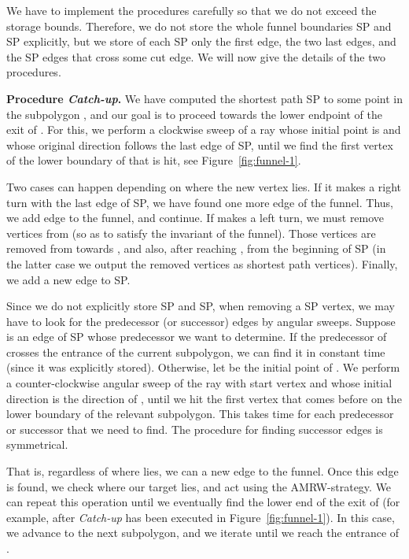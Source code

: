 \documentclass[11pt,a4paper]{article}
\begin{document}
We have to implement the procedures carefully so that we do not exceed the
storage bounds.  Therefore, we do not store the whole funnel boundaries
SP and SP explicitly, but we store of each SP only the first edge,
the two last edges, and the  SP edges that cross some cut edge.
We will now give the details of the two procedures.

\noindent
\textbf{Procedure \emph{Catch-up}.}
We have computed the shortest path SP to some point
 in the subpolygon
, and our goal is to proceed towards
the lower endpoint of the exit of .
For this, we perform a clockwise sweep of a ray whose initial point is 
and whose original direction follows the last edge of SP, until we
find the first vertex of the lower boundary of  that is hit,
see Figure~\ref{fig:funnel-1}.

Two cases can happen depending on where the new vertex  lies. If it
makes a right turn with the last edge of SP, we have found
one more edge of the funnel. Thus, we add edge  to the funnel, and
continue. If  makes a left turn, we must remove vertices from 
(so as to satisfy the invariant of the funnel). Those vertices are
removed from  towards ,
and also, after reaching , from the beginning of SP (in the
latter case we output the removed vertices as shortest path vertices).
Finally, we add a new edge to SP.

Since we do not explicitly store SP and SP, when removing a SP vertex,
we may have to look for the
predecessor (or successor) edges by angular sweeps.
Suppose  is an edge of SP whose predecessor we want to determine.
If the predecessor of  crosses the entrance of the current subpolygon,
we can find it in constant time (since it was explicitly stored).
Otherwise, let  be the initial point of .
We perform a counter-clockwise angular sweep of the ray with
start vertex  and whose initial direction is the direction of ,
until we hit the first vertex that comes before 
on the lower boundary of the relevant subpolygon.  This takes
 time for each predecessor or successor that we need to find.
The procedure for finding successor edges is symmetrical.

That is, regardless of where  lies, we can a new edge to the funnel. Once this edge is found, we check where our target lies, and act using the AMRW-strategy. We can repeat this operation until we eventually find the lower end of the exit of  (for example, after  {\em Catch-up} has been executed in Figure~\ref{fig:funnel-1}). In this case, we advance  to the next subpolygon, and we iterate until we reach the entrance of .
\end{document}
